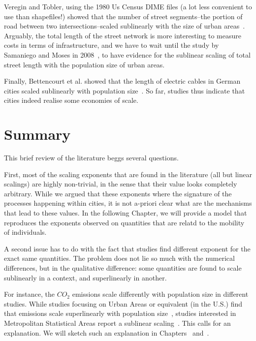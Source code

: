 Veregin and Tobler, using the 1980 Us Census DIME files (a lot less convenient
to use than shapefiles!) showed that the number of street segments--the portion
of road between two intersections--scaled sublinearly with the size of urban
areas~\cite{Veregin:1997}. Arguably, the total length of the street network is
more interesting to measure costs in terms of infrastructure, and we have to
wait until the study by Samaniego and Moses in 2008~\cite{Samaniego:2008}, to
have evidence for the sublinear scaling of total street length with the
population size of urban areas. 

Finally, Bettencourt et al. showed that the length of electric cables in German
cities scaled sublinearly with population size~\cite{Bettencourt:2007}. So far,
studies thus indicate that cities indeed realise some economies of scale.

\section{Summary}
\label{sec:summary}


This brief review of the literature beggs several questions. 

First, most of the scaling exponents that are found in the literature (all but
linear scalings) are highly non-trivial, in the sense that their value looks
completely arbitrary. While we argued that these exponents where the signature
of the processes happening within cities, it is not a-priori clear what are the
mechanisms that lead to these values. In the following Chapter, we will provide
a model that reproduces the exponents observed on quantities that are relatd to
the mobility of individuals.

A second issue has to do with the fact that studies find different exponent for
the exact same quantities. The problem does not lie so much with the numerical
differences, but in the qualitative difference: some quantities are found to
scale sublinearly in a context, and superlinearly in another. 

For instance, the $CO_2$ emissions scale differently with population size in
different studies. While studies focusing on Urban Areas or equivalent (in the
U.S.) find that emissions scale superlinearly with population
size~\cite{Louf:2014_scaling, Oliveira:2014}, studies interested in Metropolitan
Statistical Areas report a sublinear scaling~\cite{Fragkias:2013}. This calls
for an explanation. We will sketch such an explanation in
Chapters~\cite{chap:scaling_model} and~\cite{chap:scaling_implications}.
